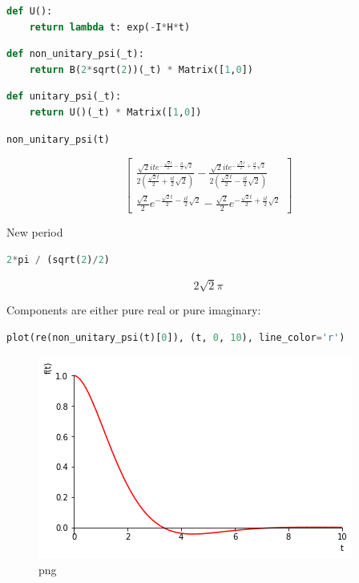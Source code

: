 \begin{lstlisting}[language=Python]
def U():
    return lambda t: exp(-I*H*t)
\end{lstlisting}

\begin{lstlisting}[language=Python]
def non_unitary_psi(_t):
    return B(2*sqrt(2))(_t) * Matrix([1,0])
\end{lstlisting}

\begin{lstlisting}[language=Python]
def unitary_psi(_t):
    return U()(_t) * Matrix([1,0])
\end{lstlisting}

\begin{lstlisting}[language=Python]
non_unitary_psi(t)
\end{lstlisting}

\begin{equation}\label{eq:sympy:non-unitary-evol}
    \left[\begin{matrix}\frac{\sqrt{2} i t e^{- \frac{\sqrt{2} t}{2} - \frac{i t}{2} \sqrt{2}}}{2 \left(\frac{\sqrt{2} t}{2} + \frac{i t}{2} \sqrt{2}\right)} - \frac{\sqrt{2} i t e^{- \frac{\sqrt{2} t}{2} + \frac{i t}{2} \sqrt{2}}}{2 \left(\frac{\sqrt{2} t}{2} - \frac{i t}{2} \sqrt{2}\right)}\\\frac{\sqrt{2}}{2} e^{- \frac{\sqrt{2} t}{2} - \frac{i t}{2} \sqrt{2}} - \frac{\sqrt{2}}{2} e^{- \frac{\sqrt{2} t}{2} + \frac{i t}{2} \sqrt{2}}\end{matrix}\right]
\end{equation}    


New period

\begin{lstlisting}[language=Python]
2*pi / (sqrt(2)/2)
\end{lstlisting}

\[2 \sqrt{2} \pi\]

Components are either pure real or pure imaginary:

\begin{lstlisting}[language=Python]
plot(re(non_unitary_psi(t)[0]), (t, 0, 10), line_color='r')
\end{lstlisting}

\begin{figure}
\centering
\includegraphics[width=0.66\linewidth]{output_20_0.png}
\caption[]{png}
\end{figure}

